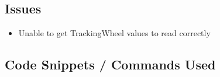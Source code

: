 \subsection{Issues}
\begin{itemize}
    \item Unable to get TrackingWheel values to read correctly
\end{itemize}

\subsection{Code Snippets / Commands Used}
\begin{lstlisting}
     
\end{lstlisting}



